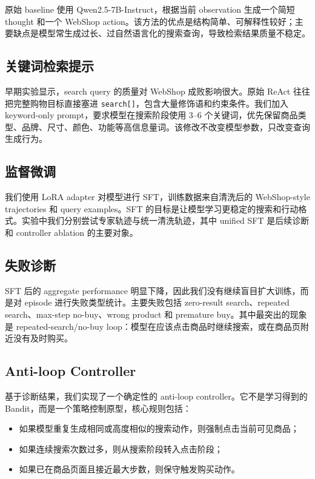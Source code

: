 \documentclass[11pt]{article}
\begin{document}
原始 baseline 使用 Qwen2.5-7B-Instruct，根据当前 observation 生成一个简短 thought 和一个 WebShop action。该方法的优点是结构简单、可解释性较好；主要缺点是模型常生成过长、过自然语言化的搜索查询，导致检索结果质量不稳定。

\subsection{关键词检索提示}

早期实验显示，search query 的质量对 WebShop 成败影响很大。原始 ReAct 往往把完整购物目标直接塞进 \texttt{search[]}，包含大量修饰语和约束条件。我们加入 keyword-only prompt，要求模型在搜索阶段使用 3--6 个关键词，优先保留商品类型、品牌、尺寸、颜色、功能等高信息量词。该修改不改变模型参数，只改变查询生成行为。

\subsection{监督微调}

我们使用 LoRA adapter 对模型进行 SFT，训练数据来自清洗后的 WebShop-style trajectories 和 query examples。SFT 的目标是让模型学习更稳定的搜索和行动格式。实验中我们分别尝试专家轨迹与统一清洗轨迹，其中 unified SFT 是后续诊断和 controller ablation 的主要对象。

\subsection{失败诊断}

SFT 后的 aggregate performance 明显下降，因此我们没有继续盲目扩大训练，而是对 episode 进行失败类型统计。主要失败包括 zero-result search、repeated search、max-step no-buy、wrong product 和 premature buy。其中最突出的现象是 repeated-search/no-buy loop：模型在应该点击商品时继续搜索，或在商品页附近没有及时购买。

\subsection{Anti-loop Controller}

基于诊断结果，我们实现了一个确定性的 anti-loop controller。它不是学习得到的 Bandit，而是一个策略控制原型，核心规则包括：

\begin{itemize}
    \item 如果模型重复生成相同或高度相似的搜索动作，则强制点击当前可见商品；
    \item 如果连续搜索次数过多，则从搜索阶段转入点击阶段；
    \item 如果已在商品页面且接近最大步数，则保守触发购买动作。
\end{itemize}
\end{document}
